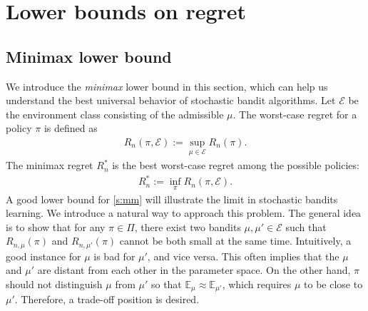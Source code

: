 \documentclass[10pt, openright]{book}
\numberwithin{equation}{section}
\theoremstyle{plain}
\theoremstyle{definition}
\def\E{{\mathbb E}}
\def\V{{\mathcal E}}
\def\e{{\varepsilon}}
\begin{document}



\section{Lower bounds on regret}

\subsection{Minimax lower bound}

We introduce the \emph{minimax} lower bound in this section, which can help us understand the best universal behavior of stochastic bandit algorithms. Let $\V$ be the environment class consisting of the admissible $\mu$. The worst-case regret for a policy $\pi$ is defined as 
\begin{align*}
R_n(\pi, \V):=\sup_{\mu\in\V}R_n(\pi).
\end{align*}
The minimax regret $R_n^*$ is the best worst-case regret among the possible policies: 
\begin{align}
R_n^*:=\inf_{\pi}R_n(\pi, \V).\label{s:mm}
\end{align}
A good lower bound for \eqref{s:mm} will illustrate the limit in stochastic bandits learning. We introduce a natural way to approach this problem.  The general idea is to show that for any $\pi\in\Pi$, there exist two bandits $\mu, \mu'\in\V$ such that $R_{n,\mu}(\pi)$ and $R_{n,\mu'}(\pi)$ cannot be both small at the same time. Intuitively, a good instance for $\mu$ is bad for $\mu'$, and vice versa. This often implies that the $\mu$ and $\mu'$ are distant from each other in the parameter space. On the other hand, $\pi$ should not distinguish $\mu$ from $\mu'$ so that $\E_\mu\approx\E_{\mu'}$, which requires $\mu$ to be close to $\mu'$. Therefore, a trade-off position is desired.  
\end{document}
